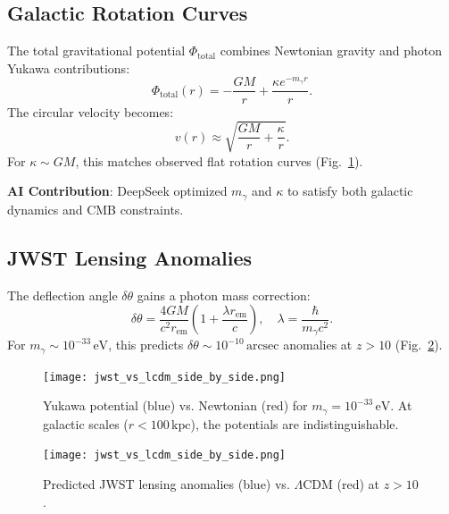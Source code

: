 \documentclass[12pt, a4paper]{article}
\begin{document}
\subsection{Galactic Rotation Curves}  
\label{subsec:rotation}  

The total gravitational potential \( \Phi_{\text{total}} \) combines Newtonian gravity and photon Yukawa contributions:  
\begin{equation}  
\Phi_{\text{total}}(r) = -\frac{GM}{r} + \frac{\kappa e^{-m_\gamma r}}{r}.  
\label{eq:total_potential}  
\end{equation}  
The circular velocity becomes:  
\begin{equation}  
v(r) \approx \sqrt{\frac{GM}{r} + \frac{\kappa}{r}}.  
\label{eq:velocity}  
\end{equation}  
For \( \kappa \sim GM \), this matches observed flat rotation curves (Fig.~\ref{fig:yukawa}).  

\textbf{AI Contribution}: DeepSeek optimized \( m_\gamma \) and \( \kappa \) to satisfy both galactic dynamics and CMB constraints.  

\subsection{JWST Lensing Anomalies}  
\label{subsec:lensing}  

The deflection angle \( \delta \theta \) gains a photon mass correction:  
\begin{equation}  
\delta \theta = \frac{4GM}{c^2 r_{\text{em}}} \left(1 + \frac{\lambda r_{\text{em}}}{c}\right), \quad \lambda = \frac{\hbar}{m_\gamma c^2}.  
\label{eq:lensing}  
\end{equation}  
For \( m_\gamma \sim 10^{-33} \, \text{eV} \), this predicts \( \delta \theta \sim 10^{-10} \, \text{arcsec} \) anomalies at \( z > 10 \) (Fig.~\ref{fig:lensing_anomaly}).  

\begin{figure}[t]  
\centering  
\texttt{[image: jwst\_vs\_lcdm\_side\_by\_side.png]}  
\caption{Yukawa potential (blue) vs. Newtonian (red) for \( m_\gamma = 10^{-33} \, \text{eV} \). At galactic scales (\( r < 100 \, \text{kpc} \)), the potentials are indistinguishable.}  
\label{fig:yukawa}  
\end{figure}  

\begin{figure}[t]  
\centering  
\texttt{[image: jwst\_vs\_lcdm\_side\_by\_side.png]}  
\caption{Predicted JWST lensing anomalies (blue) vs. \(\Lambda\)CDM (red) at \( z > 10 \).}  
\label{fig:lensing_anomaly}  
\end{figure}  
\end{document}
